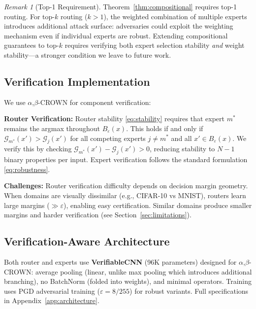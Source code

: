 \documentclass{article}
\theoremstyle{plain}
\theoremstyle{remark}
\newtheorem{remark}[theorem]{Remark}
\begin{document}
\begin{remark}[Top-1 Requirement]
Theorem~\ref{thm:compositional} requires top-1 routing. For top-$k$ routing ($k > 1$), the weighted combination of multiple experts introduces additional attack surface: adversaries could exploit the weighting mechanism even if individual experts are robust. Extending compositional guarantees to top-$k$ requires verifying both expert selection stability \textit{and} weight stability---a stronger condition we leave to future work.
\end{remark}

\subsection{Verification Implementation}

We use $\alpha$,$\beta$-CROWN for component verification:

\textbf{Router Verification:} Router stability \eqref{eq:stability} requires that expert $m^*$ remains the argmax throughout $B_\varepsilon(x)$. This holds if and only if $\mathcal{G}_{m^*}(x') > \mathcal{G}_j(x')$ for all competing experts $j \neq m^*$ and all $x' \in B_\varepsilon(x)$. We verify this by checking $\mathcal{G}_{m^*}(x') - \mathcal{G}_j(x') > 0$, reducing stability to $N-1$ binary properties per input. Expert verification follows the standard formulation \eqref{eq:robustness}.

\textbf{Challenges:} Router verification difficulty depends on decision margin geometry. When domains are visually dissimilar (e.g., CIFAR-10 vs MNIST), routers learn large margins ($\gg \varepsilon$), enabling easy certification. Similar domains produce smaller margins and harder verification (see Section~\ref{sec:limitations}).

\subsection{Verification-Aware Architecture}

Both router and experts use \textbf{VerifiableCNN} (96K parameters) designed for $\alpha$,$\beta$-CROWN: average pooling (linear, unlike max pooling which introduces additional branching), no BatchNorm (folded into weights), and minimal operators. Training uses PGD adversarial training ($\varepsilon = 8/255$) for robust variants. Full specifications in Appendix~\ref{app:architecture}.

\end{document}
